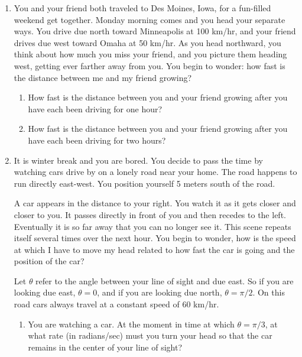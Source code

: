 \documentclass[14pt]{extarticle}
\begin{document}
\begin{enumerate}
\setlength{\itemsep}{3mm}

\item You and your friend both traveled to Des Moines, Iowa, for a
fun-filled weekend get together. Monday morning comes and you head your
separate ways. You drive due north toward Minneapolis at 100 km/hr,
and your friend drives due west toward Omaha at 50 km/hr. As you head
northward, you think about how much you miss your friend, and you
picture them heading west, getting ever farther away from you. You
begin to wonder: how fast is the distance between me and my friend
growing?

\begin{enumerate}

  \item How fast is the distance between you and your friend growing
    after you have each been driving for one hour?
    
  \item How fast is the distance between you and your friend growing
    after you have each been driving for two hours? \\

\end{enumerate}




\item It is winter break and you are bored. You decide to pass the time by 
watching cars drive by on a lonely road near your home.  The road
happens to run directly east-west. You position yourself 5 meters
south of the road.

A car appears in the distance to your right. You watch it as it gets
closer and closer to you.  It passes directly in front of you and then
recedes to the left. Eventually it is so far away that you can no
longer see it.
This scene repeats itself several times over the next hour.  You begin
to wonder, how is the speed at which I have to move my head related to
how fast the car is going and the position of the car?

Let $\theta$ refer to the angle between your line of sight and due
east. So if you are looking due east, $\theta=0$, and if you are
looking due north, $\theta = \pi/2$.  On this road cars always travel
at a constant speed of 60 km/hr. 


\begin{enumerate}

\item You are watching a car.  At the moment in time at which
  $\theta=\pi/3$, at what rate (in radians/sec) must you turn your
  head so that the car remains in the center of your line of sight?


\end{enumerate}
\end{enumerate}
\end{document}
